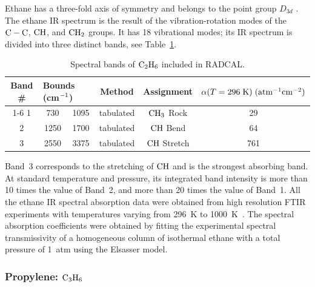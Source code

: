Ethane has a three-fold axis of symmetry and belongs to the point group $D_{3d}$ \cite{Herzberg:1949}. The ethane IR spectrum is the result of the vibration-rotation modes of the $\rm C-C$, $\rm CH$, and $\rm CH_2$ groups. It has 18 vibrational modes; its IR spectrum is divided into three distinct bands, see Table~\ref{Table::C2H6}.
\begin{table} [ht]
    \centering
    \caption[Spectral bands of $\rm C_2H_6$ included in RADCAL]{Spectral bands of $\rm C_2H_6$ included in RADCAL.}
    \vspace{0.1in}
    \label{Table::C2H6}
    \begin{tabular}{|c|c|c|c|c|c|}
      \hline
      Band \# & \multicolumn{2}{|l|}{Bounds (cm$\rm ^{-1}$) } & Method & Assignment & $\alpha(T=296 \; {\rm K}) \; (\rm {atm^{-1} cm^{-2}})$\\
      \cline{1-6}
      1 & 730  & 1095 & tabulated &  $\rm CH_3$ Rock   &  29  \\
      2 & 1250 & 1700 & tabulated &  $\rm CH$  Bend    &  64  \\
      3 & 2550 & 3375 & tabulated &  $\rm CH$  Stretch &  761 \\
      \hline
    \end{tabular}
\end{table}
Band~3 corresponds to the stretching of $\rm CH$ and is the strongest absorbing band. At standard temperature and pressure, its integrated band intensity is more than 10 times the value of
Band~2, and more than 20 times the value of Band~1. All the ethane IR spectral absorption data were obtained from high resolution FTIR experiments with temperatures varying from 296~K to 1000~K~\cite{Wakatsuki:2005}. The spectral absorption coefficients were obtained by fitting the experimental spectral transmissivity of a homogeneous column of isothermal ethane with a total pressure of 1~atm using the Elsasser model.

\subsubsection{Propylene: $\rm C_3H_6$}

